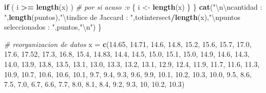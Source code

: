\documentclass[]{article}
\newenvironment{Shaded}{\begin{snugshade}}{\end{snugshade}}
\newcommand{\KeywordTok}[1]{\textcolor[rgb]{0.13,0.29,0.53}{\textbf{#1}}}
\newcommand{\DecValTok}[1]{\textcolor[rgb]{0.00,0.00,0.81}{#1}}
\newcommand{\FloatTok}[1]{\textcolor[rgb]{0.00,0.00,0.81}{#1}}
\newcommand{\CharTok}[1]{\textcolor[rgb]{0.31,0.60,0.02}{#1}}
\newcommand{\StringTok}[1]{\textcolor[rgb]{0.31,0.60,0.02}{#1}}
\newcommand{\CommentTok}[1]{\textcolor[rgb]{0.56,0.35,0.01}{\textit{#1}}}
\newcommand{\ControlFlowTok}[1]{\textcolor[rgb]{0.13,0.29,0.53}{\textbf{#1}}}
\newcommand{\OperatorTok}[1]{\textcolor[rgb]{0.81,0.36,0.00}{\textbf{#1}}}
\newcommand{\NormalTok}[1]{#1}
\begin{document}
\begin{Shaded}
\begin{Highlighting}[]
    \ControlFlowTok{if}\NormalTok{ ( i }\OperatorTok{>=}\StringTok{ }\KeywordTok{length}\NormalTok{(x) ) }\CommentTok{# por si acaso :v }
\NormalTok{    \{}
\NormalTok{      i <-}\StringTok{ }\KeywordTok{length}\NormalTok{(x)}
\NormalTok{    \}}
\NormalTok{  \}}
  \KeywordTok{cat}\NormalTok{(}\StringTok{"}\CharTok{\textbackslash{}n\textbackslash{}n}\StringTok{cantidad : "}\NormalTok{,}\KeywordTok{length}\NormalTok{(puntos),}\StringTok{"}\CharTok{\textbackslash{}t}\StringTok{indice de Jaccard : "}\NormalTok{,totintersect}\OperatorTok{/}\KeywordTok{length}\NormalTok{(x),}\StringTok{"}\CharTok{\textbackslash{}n}\StringTok{puntos seleccionados : "}\NormalTok{,puntos,}\StringTok{"}\CharTok{\textbackslash{}n}\StringTok{"}\NormalTok{)}
\NormalTok{\}}


\CommentTok{# reorganizacion de datos }
\NormalTok{x =}\StringTok{ }\KeywordTok{c}\NormalTok{(}\FloatTok{14.65}\NormalTok{, }\FloatTok{14.71}\NormalTok{, }\FloatTok{14.6}\NormalTok{, }\FloatTok{14.8}\NormalTok{, }\FloatTok{15.2}\NormalTok{, }\FloatTok{15.6}\NormalTok{, }\FloatTok{15.7}\NormalTok{, }\FloatTok{17.0}\NormalTok{, }\FloatTok{17.6}\NormalTok{, }\FloatTok{17.52}\NormalTok{, }\FloatTok{17.3}\NormalTok{, }
      \FloatTok{16.8}\NormalTok{, }\FloatTok{15.4}\NormalTok{, }\FloatTok{14.83}\NormalTok{, }\FloatTok{14.4}\NormalTok{, }\FloatTok{14.5}\NormalTok{, }
      \FloatTok{15.0}\NormalTok{, }\FloatTok{15.1}\NormalTok{, }\FloatTok{15.0}\NormalTok{, }\FloatTok{14.9}\NormalTok{, }\FloatTok{14.6}\NormalTok{, }\FloatTok{14.3}\NormalTok{, }\FloatTok{14.0}\NormalTok{, }\FloatTok{13.9}\NormalTok{, }\FloatTok{13.8}\NormalTok{, }\FloatTok{13.5}\NormalTok{, }\FloatTok{13.1}\NormalTok{, }\FloatTok{13.0}\NormalTok{, }
      \FloatTok{13.3}\NormalTok{, }\FloatTok{13.2}\NormalTok{, }\FloatTok{13.1}\NormalTok{, }\FloatTok{12.9}\NormalTok{, }\FloatTok{12.4}\NormalTok{, }\FloatTok{11.9}\NormalTok{, }\FloatTok{11.7}\NormalTok{, }\FloatTok{11.6}\NormalTok{, }\FloatTok{11.3}\NormalTok{, }\FloatTok{10.9}\NormalTok{, }
      \FloatTok{10.7}\NormalTok{, }\FloatTok{10.6}\NormalTok{, }\FloatTok{10.6}\NormalTok{, }\FloatTok{10.1}\NormalTok{, }\FloatTok{9.7}\NormalTok{, }\FloatTok{9.4}\NormalTok{, }\FloatTok{9.3}\NormalTok{, }\FloatTok{9.6}\NormalTok{, }\FloatTok{9.9}\NormalTok{, }\FloatTok{10.1}\NormalTok{, }\FloatTok{10.2}\NormalTok{, }\FloatTok{10.3}\NormalTok{,  }\FloatTok{10.0}\NormalTok{, }\FloatTok{9.5}\NormalTok{, }
      \FloatTok{8.6}\NormalTok{, }\FloatTok{7.5}\NormalTok{, }\FloatTok{7.0}\NormalTok{, }\FloatTok{6.7}\NormalTok{, }\FloatTok{6.6}\NormalTok{, }\FloatTok{7.7}\NormalTok{, }
      \FloatTok{8.0}\NormalTok{, }\FloatTok{8.1}\NormalTok{, }\FloatTok{8.4}\NormalTok{, }\FloatTok{9.2}\NormalTok{, }\FloatTok{9.3}\NormalTok{, }\DecValTok{10}\NormalTok{, }\FloatTok{10.2}\NormalTok{, }\FloatTok{10.3}\NormalTok{)}


\end{Highlighting}
\end{Shaded}
\end{document}
